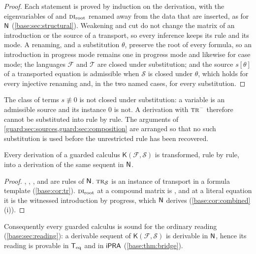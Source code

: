\begin{proof}
Each statement is proved by induction on the derivation, with the
eigenvariables of  and $\rulename{DI}_{\mathrm{root}}$ renamed
away from the data that are inserted, as for $\mathsf{N}$
(\cref{base:sec:structural}).  Weakening and cut do not change the matrix of
an introduction or the source of a transport, so every inference keeps its
rule and its mode.  A renaming, and a substitution $\theta$, preserve the
root of every formula, so an introduction in progress mode remains one in
progress mode and likewise for case mode; the languages $\mathcal F$ and
$\mathcal T$ are closed under substitution; and the source $s[\theta]$ of a
transported equation is admissible when $\mathcal S$ is closed under
$\theta$, which holds for every injective renaming and, in the two named
cases, for every substitution.
\end{proof}

The class of terms $s\not\equiv 0$ is not closed under substitution: a
variable is an admissible source and its instance $0$ is not.  A derivation
with $\rulename{Tr}^{-}$ therefore cannot be substituted into rule by rule.
The arguments of \cref{guard:sec:sources,guard:sec:composition} are arranged
so that no such substitution is used before the unrestricted rule has been
recovered.

\begin{lemma}
\label{guard:lem:incl}
Every derivation of a guarded calculus $\mathsf K(\mathcal F,\mathcal S)$
is transformed, rule by rule, into a derivation of the same sequent in
$\mathsf{N}$.
\end{lemma}

\begin{proof}
, , ,  and 
are rules of $\mathsf{N}$.  $\rulename{Tr}_{\mathcal S}$ is an instance of
transport in a formula template (\cref{base:cor:tr}).
$\rulename{DI}_{\mathrm{root}}$ at a compound matrix is , and
at a literal equation it is the witnessed introduction by progress, which
$\mathsf{N}$ derives (\cref{base:cor:combined}(i)).
\end{proof}

Consequently every guarded calculus is sound for the ordinary reading
(\cref{base:sec:reading}): a derivable sequent of
$\mathsf K(\mathcal F,\mathcal S)$ is derivable in $\mathsf{N}$, hence its reading
is provable in $\mathsf{T}_{\mathrm{eq}}$ and in $\mathsf{iPRA}$ (\cref{base:thm:bridge}).

